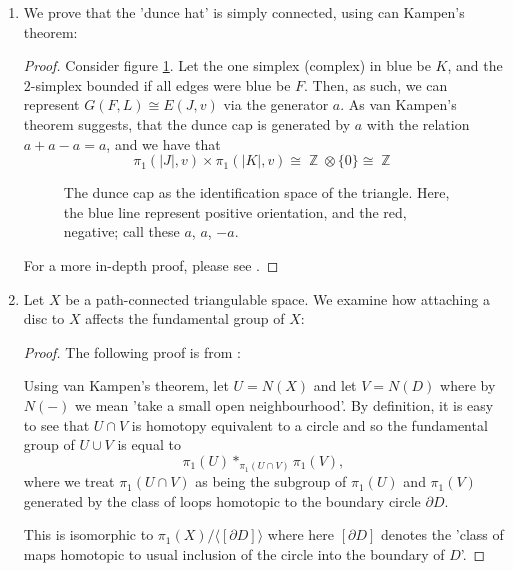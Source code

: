 \documentclass{book}
\DeclareMathOperator*{\Z}{\mathbb{Z}}
\begin{document}
\begin{enumerate}[(1)]
    \item We prove that the 'dunce hat' is simply connected, using can Kampen's theorem:    
        \begin{proof} Consider figure \hyperref[fig:tikz:dunceCap]{\ref{fig:tikz:dunceCap}}. Let the one simplex (complex) in blue be $K$, and the $2$-simplex bounded if all edges were blue be $F$. Then, as such, we can represent $G(F,L) \cong E(J,v)$ via the generator $a$. As van Kampen's theorem suggests, that the dunce cap is generated by $a$ with the relation $a + a -a = a$, and we have that 
            \[\pi_1 (|J|, v) \times \pi_1(|K|, v) \cong \Z \otimes \{0 \} \cong \Z \]
            \begin{figure}[p]
                \centering
                
                \caption{The dunce cap as the identification space of the triangle. Here, the blue line represent positive orientation, and the red, negative; call these $a$, $a$, $-a$.}
                \label{fig:tikz:dunceCap}
            \end{figure}
            \par For a more in-depth proof, please see \cite{math205topology}. 
        \end{proof}

    \item Let $X$ be a path-connected triangulable space. We examine how attaching a disc to $X$ affects the fundamental group of $X$:  
        \begin{proof} The following proof is from \cite{attachingDisc}: 
            \par Using van Kampen's theorem, let $U=N(X)$ and let $V=N(D)$ where by $N(-)$ we mean 'take a small open neighbourhood'. By definition, it is easy to see that $U\cap V$ is homotopy equivalent to a circle and so the fundamental group of $U\cup V$ is equal to 
            \[\pi_1(U)\ast_{\pi_1(U\cap V)}\pi_1(V),\] 
            where we treat $\pi_1(U\cap V)$ as being the subgroup of $\pi_1(U)$ and $\pi_1(V)$ generated by the class of loops homotopic to the boundary circle $\partial D$.
            \par This is isomorphic to $\pi_1(X)/\langle[\partial D]\rangle$ where here $[\partial D]$ denotes the 'class of maps homotopic to usual inclusion of the circle into the boundary of $D$'.
        \end{proof}


\end{enumerate}
\end{document}
